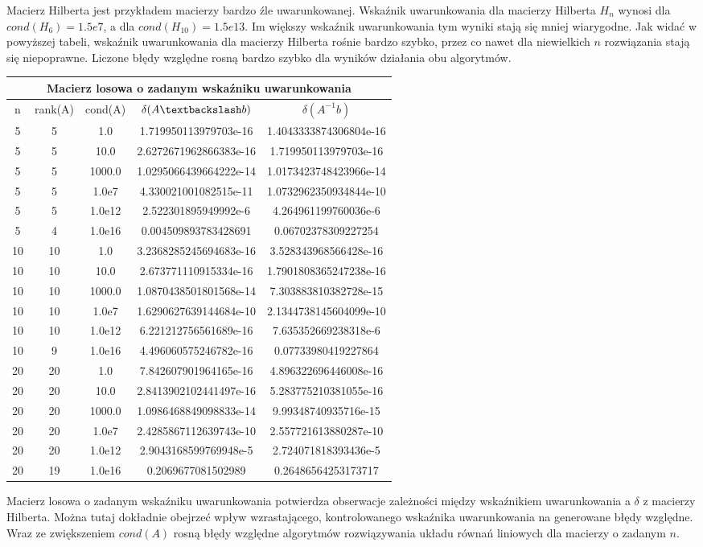 \documentclass[a4paper]{article}
\begin{document}
Macierz Hilberta jest przykładem macierzy bardzo źle uwarunkowanej. Wskaźnik uwarunkowania dla macierzy Hilberta $H_{n}$ wynosi dla $cond(H_{6}) = 1.5e7$, a dla $cond(H_{10}) = 1.5e13$. Im większy wskaźnik uwarunkowania tym wyniki stają się mniej wiarygodne. Jak widać w powyższej tabeli, wskaźnik uwarunkowania dla macierzy Hilberta rośnie bardzo szybko, przez co nawet dla niewielkich $n$ rozwiązania stają się niepoprawne. Liczone błędy względne rosną bardzo szybko dla wyników działania obu algorytmów.
\begin{center}
 \begin{tabular}{ |c | c | c | c | c|  }
 \hline
 \multicolumn{5}{|c|}{Macierz losowa o zadanym wskaźniku uwarunkowania} \\
 \hline
 n & rank(A) & cond(A) & $\delta (A\textbackslash b)$ & $\delta (A^{-1}b)$ \\
 \hline
 5 & 5 & 1.0 & 1.719950113979703e-16 & 1.4043333874306804e-16 \\
5 & 5 & 10.0 & 2.6272671962866383e-16 & 1.719950113979703e-16 \\
5 & 5 & 1000.0 & 1.0295066439664222e-14 & 1.0173423748423966e-14 \\
5 & 5 & 1.0e7 & 4.330021001082515e-11 & 1.0732962350934844e-10 \\
5 & 5 & 1.0e12 & 2.522301895949992e-6 & 4.264961199760036e-6 \\
5 & 4 & 1.0e16 & 0.004509893783428691 & 0.06702378309227254 \\
10 & 10 & 1.0 & 3.2368285245694683e-16 & 3.528343968566428e-16 \\
10 & 10 & 10.0 & 2.673771110915334e-16 & 1.7901808365247238e-16 \\
10 & 10 & 1000.0 & 1.0870438501801568e-14 & 7.303883810382728e-15 \\
10 & 10 & 1.0e7 & 1.6290627639144684e-10 & 2.1344738145604099e-10 \\
10 & 10 & 1.0e12 & 6.221212756561689e-16 & 7.635352669238318e-6 \\
10 & 9 & 1.0e16 & 4.496060575246782e-16 & 0.07733980419227864 \\
20 & 20 & 1.0 & 7.842607901964165e-16 & 4.896322696446008e-16 \\
20 & 20 & 10.0 & 2.8413902102441497e-16 & 5.283775210381055e-16 \\
20 & 20 & 1000.0 & 1.0986468849098833e-14 & 9.99348740935716e-15 \\
20 & 20 & 1.0e7 & 2.4285867112639743e-10 & 2.557721613880287e-10 \\
20 & 20 & 1.0e12 & 2.9043168599769948e-5 & 2.724071818393436e-5 \\
20 & 19 & 1.0e16 & 0.2069677081502989 & 0.26486564253173717 \\
 \hline
\end{tabular}
\end{center}
Macierz losowa o zadanym wskaźniku uwarunkowania potwierdza obserwacje zależności między wskaźnikiem uwarunkowania a $\delta$ z macierzy Hilberta. Można tutaj dokładnie obejrzeć wpływ wzrastającego, kontrolowanego wskaźnika uwarunkowania na generowane błędy względne. Wraz ze zwiększeniem $cond(A)$ rosną błędy względne algorytmów rozwiązywania układu równań liniowych dla macierzy o zadanym $n$.
\end{document}
